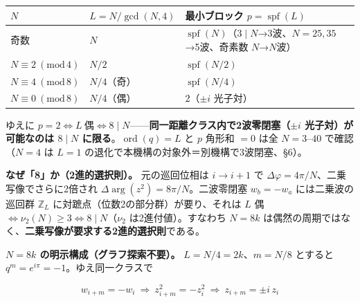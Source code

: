 \documentclass[
  a4paper,
]{ltjsarticle}
\newcounter{none} %
\begin{document}
{\def\LTcaptype{none} %
\begin{longtable}[]{@{}
  >{\raggedright\arraybackslash}p{}
  >{\raggedright\arraybackslash}p{}
  >{\raggedright\arraybackslash}p{}@{}}
\toprule\noalign{}
\begin{minipage}[b]{\linewidth}\raggedright
\(N\)
\end{minipage} & \begin{minipage}[b]{\linewidth}\raggedright
\(L=N/\gcd(N,4)\)
\end{minipage} & \begin{minipage}[b]{\linewidth}\raggedright
最小ブロック \(p=\operatorname{spf}(L)\)
\end{minipage} \\
\midrule\noalign{}
\endhead
\bottomrule\noalign{}
\endlastfoot
奇数 & \(N\) &
\(\operatorname{spf}(N)\)（\(3\mid N\)→3波、\(N=25,35\)→5波、奇素数
\(N\)→\(N\)波） \\
\(N\equiv2\ (\mathrm{mod}\,4)\) & \(N/2\) &
\(\operatorname{spf}(N/2)\) \\
\(N\equiv4\ (\mathrm{mod}\,8)\) & \(N/4\)（奇） &
\(\operatorname{spf}(N/4)\) \\
\(N\equiv0\ (\mathrm{mod}\,8)\) & \(N/4\)（偶） & \(2\)（\(\pm i\)
光子対） \\
\end{longtable}
}

ゆえに
\(\boxed{p=2\iff L\ \text{偶}\iff 8\mid N}\)------\textbf{同一距離クラス内で2波零閉塞（\(\pm i\)
光子対）が可能なのは \(8\mid N\) に限る}。\(\operatorname{ord}(q)=L\) と
\(p\) 角形和 \(=0\) は全 \(N=3\)--\(40\) で確認（\(N=4\) は \(L=1\)
の退化で本機構の対象外＝別機構で3波閉塞、§6）。

\textbf{なぜ「8」か（2進的選択則）。} 元の巡回位相は \(i\to i+1\) で
\(\Delta\varphi=4\pi/N\)、二乗写像でさらに2倍され
\(\Delta\arg(z^2)=8\pi/N\)。二波零閉塞 \(w_b=-w_a\) には二乗波の巡回群
\(\mathbb Z_L\) に対蹠点（位数2の部分群）が要り、それは \(L\) 偶
\(\iff\nu_2(N)\ge3\iff 8\mid N\)（\(\nu_2\) は2進付値）。すなわち
\(N=8k\)
は偶然の周期ではなく、\textbf{二乗写像が要求する2進的選択則}である。

\textbf{\(N=8k\) の明示構成（グラフ探索不要）。} \(L=N/4=2k\)、\(m=N/8\)
とすると \(q^m=e^{i\pi}=-1\)。ゆえ同一クラスで

\[w_{i+m}=-w_i\ \Longrightarrow\ z_{i+m}^2=-z_i^2\ \Longrightarrow\ z_{i+m}=\pm i\,z_i\]
\end{document}

